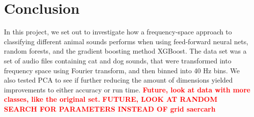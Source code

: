 \documentclass[a4paper]{article}
\newcommand\red[1]{\textcolor{red}{\textbf{#1}}}
\newcommand{\Nepochs}{N_{\text{epochs}}}
\begin{document}
\section{Conclusion} \label{chap:conclusion}
In this project, we set out to investigate how a frequency-space approach to classifying different animal sounds performs when using feed-forward neural nets, random forests, and the gradient boosting method XGBoost. The data set was a set of audio files containing cat and dog sounds, that were transformed into frequency space using Fourier transform, and then binned into 40 Hz bins. We also tested PCA to see if further reducing the amount of dimensions yielded improvements to either accuracy or run time.
\red{Future, look at data with more classes, like the original set.}
\red{FUTURE, LOOK AT RANDOM SEARCH FOR PARAMETERS INSTEAD OF grid saercarh}

\end{document}
